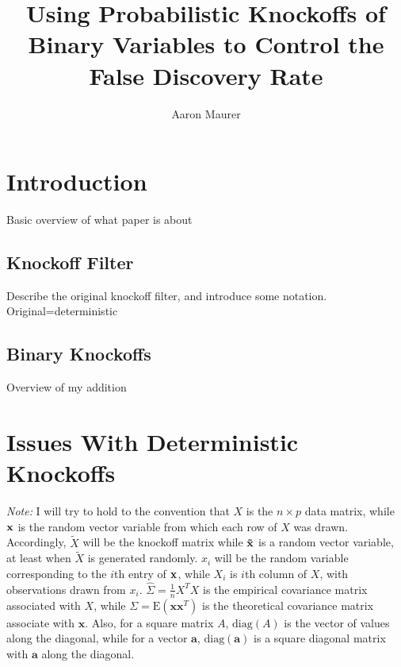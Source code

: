 \documentclass[11pt]{article}
\newcommand{\E}{\mathrm{E}}
\newcommand{\diag}{\mathrm{diag}}
\theoremstyle{definition}
\begin{document}
\title{Using Probabilistic Knockoffs of Binary Variables to Control the False Discovery Rate}
\author{Aaron Maurer}
\maketitle
\section{Introduction}
    Basic overview of what paper is about
    
\subsection{Knockoff Filter}
    Describe the original knockoff filter, and introduce some notation. Original=deterministic

\subsection{Binary Knockoffs}
    Overview of my addition

\section{Issues With Deterministic Knockoffs} 
    {\em Note:} I will try to hold to the convention that $X$ is the $n\times p$ data matrix, while $\bf x$ is the random vector variable from which each row of $X$ was drawn. Accordingly, $\tilde X$ will be the knockoff matrix while $\bf \tilde x$ is a random vector variable, at least when $\tilde X$ is generated randomly. $x_i$ will be the random variable corresponding to the $i$th entry of $\bf x$, while $X_i$ is $i$th column of $X$, with observations drawn from $x_i$. $\hat \Sigma = \frac{1}{n}X^TX$ is the empirical covariance matrix associated with $X$, while $\Sigma=\E(\mathbf x \mathbf x^T)$ is the theoretical covariance matrix associate with $\mathbf x$. Also, for a square matrix $A$, $\diag(A)$ is the vector of values along the diagonal, while for a vector $\mathbf a$, $\diag(\mathbf a)$ is a square diagonal matrix with $\mathbf a$ along the diagonal.\\
\end{document}
